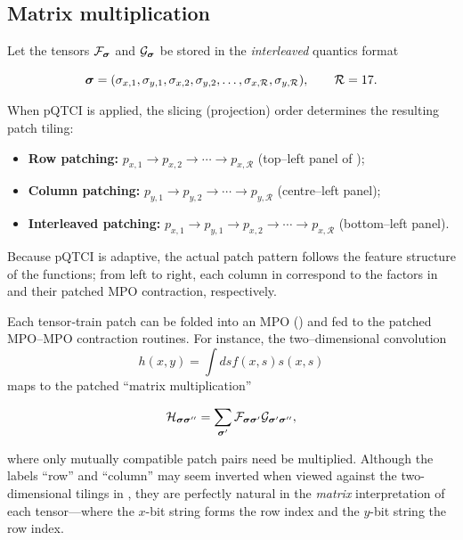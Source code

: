 \subsection{Matrix multiplication}

Let the tensors \(\mathcal{F}_{\boldsymbol{\sigma}}\) and \(\mathcal{G}_{\boldsymbol{\sigma}}\) be stored in the \emph{interleaved} quantics format  

\[
  \boldsymbol{\sigma}
  =( \sigma_{x,1},\sigma_{y,1},\sigma_{x,2},\sigma_{y,2},\dots,
     \sigma_{x,\mathcal R},\sigma_{y,\mathcal R}),
  \qquad
  \mathcal R=17.
\]

When pQTCI is applied, the slicing (projection) order determines the resulting
patch tiling:
\begin{itemize}
  \item \textbf{Row patching:}\;
        \(p_{x,1}\!\to p_{x,2}\!\to\cdots\to p_{x,\mathcal R}\)
        (top–left panel of );
  \item \textbf{Column patching:}\;
        \(p_{y,1}\!\to p_{y,2}\!\to\cdots\to p_{y,\mathcal R}\)
        (centre–left panel);
  \item \textbf{Interleaved patching:}\;
        \(p_{x,1}\!\to p_{y,1}\!\to p_{x,2}\!\to\cdots\to p_{x,\mathcal R}\)
        (bottom–left panel).
\end{itemize}

Because pQTCI is adaptive, the actual patch pattern follows the feature structure of the functions; from left to right, each column in  correspond to the factors in  and their patched MPO contraction, respectively.

Each tensor‐train patch can be folded into an MPO () and fed to the patched MPO–MPO contraction routines.  
For instance, the two–dimensional convolution  
\begin{equation}
    h(x,y) = \int ds f(x,s)s(x,s)
\end{equation}
maps to the patched ``matrix multiplication'' 

\begin{equation}
    \mathcal{H}_{\boldsymbol{\sigma}\boldsymbol{\sigma}''} = \sum_{\boldsymbol{\sigma}'} \mathcal{F}_{\boldsymbol{\sigma}\boldsymbol{\sigma}'}\mathcal{G}_{\boldsymbol{\sigma}'\boldsymbol{\sigma}''},
    \label{eq:matrixMulTensors}
\end{equation}

where only mutually compatible patch pairs need be multiplied. Although the labels “row”  and “column” may seem inverted when viewed against the two-dimensional tilings in , they are perfectly natural in the \emph{matrix} interpretation of each tensor—where the 
$x$-bit string forms the row index and the 
$y$-bit string the row index.


